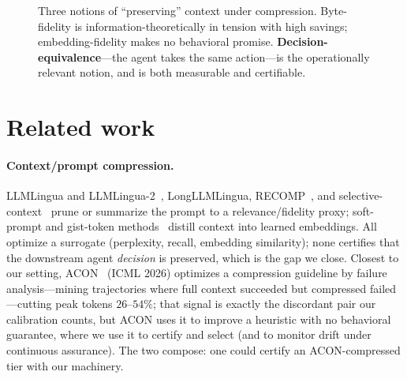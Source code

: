 \documentclass{article}
\begin{document}
\begin{figure}[t]
\centering
{}
\caption{Three notions of ``preserving'' context under compression. Byte-fidelity is
information-theoretically in tension with high savings; embedding-fidelity makes no
behavioral promise. \textbf{Decision-equivalence}---the agent takes the same
action---is the operationally relevant notion, and is both measurable and
certifiable.}
\label{fig:concept}
\end{figure}

\section{Related work}
\paragraph{Context/prompt compression.} LLMLingua and LLMLingua-2~\cite{llmlingua},
LongLLMLingua, RECOMP~\cite{recomp}, and selective-context~\cite{selectivecontext} prune
or summarize the prompt to a relevance/fidelity proxy; soft-prompt and gist-token
methods~\cite{gist} distill context into learned embeddings. All optimize a surrogate
(perplexity, recall, embedding similarity); none certifies that the downstream agent
\emph{decision} is preserved, which is the gap we close. Closest to our setting, ACON~\cite{acon}
(ICML 2026) optimizes a compression guideline by failure analysis---mining trajectories where
full context succeeded but compressed failed---cutting peak tokens $26$--$54\%$; that signal is
exactly the discordant pair our calibration counts, but ACON uses it to improve a heuristic with
no behavioral guarantee, where we use it to certify and select (and to monitor drift under
continuous assurance). The two compose: one could certify an ACON-compressed tier with our
machinery.
\end{document}
